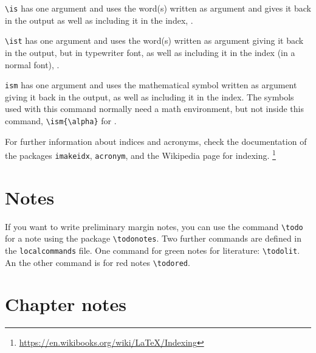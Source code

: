 \begin{itemize*}
	\item \verb|\is| has one argument and uses the word(s) written as argument and gives it back in the output as well as including it in the index, \fe {}.
	
	\item \verb|\ist| has one argument and uses the word(s) written as argument giving it back in the output, but in typewriter font, as well as including it in the index (in a normal font), \fe {}.
	
	\item \verb|ism| has one argument and uses the mathematical symbol written as argument giving it back in the output, as well as including it in the index. The symbols used with this command normally need a math environment, but not inside this command, \fe \verb|\ism{\alpha}| for \ism{\alpha}.
\end{itemize*}


For further information about indices and acronyms, check the documentation of the packages \verb|imakeidx|, \verb|acronym|, and the Wikipedia page for indexing.%
%
\footnote{\url{https://en.wikibooks.org/wiki/LaTeX/Indexing}} %
%




\section{Notes}
\label{ch:Notes}


\noindent If you want to write preliminary margin notes,  you can use the command \texttt{\textbackslash todo} for a note using the package \texttt{\textbackslash todonotes}. Two further commands are defined in the \texttt{localcommands} file. One command for green notes for literature: \texttt{\textbackslash todolit}.  An the other command is for red notes \texttt{\textbackslash todored}. 


\section{Chapter notes}
\label{ch:Chapternotes}


